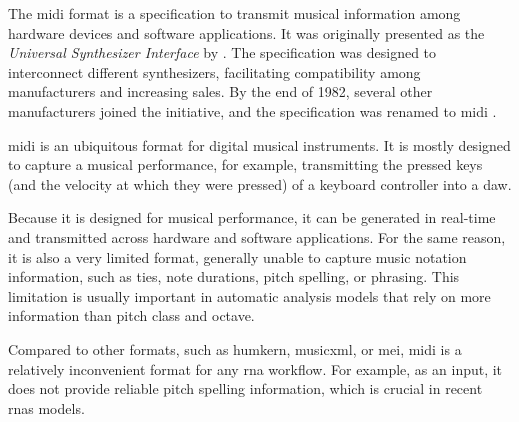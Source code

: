 


The \gls{midi} format is a specification to transmit musical
information among hardware devices and software
applications. It was originally presented as the
\emph{Universal Synthesizer Interface} by
\textcite{smith1981usi}. The specification was designed to
interconnect different synthesizers, facilitating
compatibility among manufacturers and increasing sales. By
the end of 1982, several other manufacturers joined the
initiative, and the specification was renamed to \gls{midi}
\parencite{moog1986midi}.


\gls{midi} is an ubiquitous format for digital musical
instruments. It is mostly designed to capture a musical
performance, for example, transmitting the pressed keys (and
the velocity at which they were pressed) of a keyboard
controller into a \gls{daw}.

Because it is designed for musical performance, it can be
generated in real-time and transmitted across hardware and
software applications. For the same reason, it is also a
very limited format, generally unable to capture music
notation information, such as ties, note durations, pitch
spelling, or phrasing. This limitation is usually important
in automatic analysis models that rely on more information
than pitch class and octave.



Compared to other formats, such as \gls{humkern},
\gls{musicxml}, or \gls{mei}, \gls{midi} is a relatively
inconvenient format for any \gls{rna} workflow. For example,
as an input, it does not provide reliable pitch spelling
information, which is crucial in recent \glspl{rna} models.
